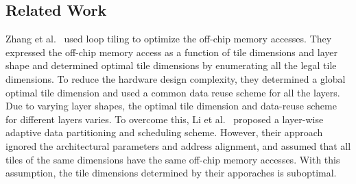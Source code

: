 \documentclass[a4paper,10pt]{article}
\begin{document}
\subsection{Related Work}
Zhang et al.~\cite{zhang2015optimizing} used loop tiling to optimize the off-chip memory accesses. They expressed the off-chip memory access as a function of tile dimensions and layer shape and determined optimal tile dimensions by enumerating all the legal tile dimensions. To reduce the hardware design complexity, they determined a global optimal tile dimension and used a common data reuse scheme for all the layers. Due to varying layer shapes, the optimal tile dimension and data-reuse scheme for different layers varies. To overcome  this, Li et al.~\cite{Li2018SmartShuttleOO} proposed a layer-wise adaptive data partitioning and scheduling scheme. However, their approach ignored the architectural parameters and address alignment, and assumed that all tiles of the same dimensions have the same off-chip memory accesses.  With this assumption, the tile dimensions determined by their apporaches is suboptimal.
\end{document}
